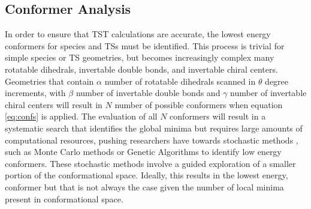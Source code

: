 \documentclass[preprint, 11pt]{elsarticle} %
\begin{document}

\subsection{Conformer Analysis}

In order to ensure that TST calculations are accurate, the lowest energy conformers for species and TSs must be identified.
This process is trivial for simple species or TS geometries, but becomes increasingly complex many rotatable dihedrals, invertable double bonds, and invertable chiral centers. 
Geometries that contain $\alpha$ number of rotatable dihedrals scanned in $\theta$ degree increments, with $\beta$ number of invertable double bonds and $\gamma$ number of invertable chiral centers will result in $N$ number of possible conformers when equation \ref{eq:confs} is applied. 
The evaluation of all $N$ conformers will result in a systematic search that identifies the global minima but requires large amounts of computational resources, pushing researchers have towards stochastic methods \cite{Ebejer:2012}, such as Monte Carlo methods or Genetic Algorithms to identify low energy conformers. 
These stochastic methods involve a guided exploration of a smaller portion of the conformational space.
Ideally, this results in the lowest energy, conformer but that is not always the case given the number of local minima present in conformational space.
\end{document}
